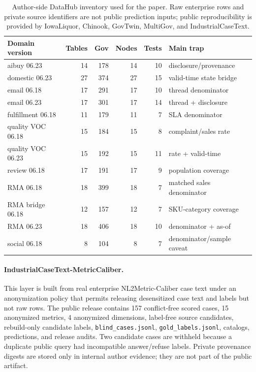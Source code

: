 \documentclass[letterpaper]{article}
\begin{document}
\begin{table}[h]
\centering
\scriptsize
\setlength{\tabcolsep}{2pt}
\begin{tabular}{lrrrrl}
\toprule
Domain version & Tables & Gov & Nodes & Tests & Main trap \\
\midrule
aibuy 06.23 & 14 & 178 & 14 & 10 & disclosure/provenance \\
domestic 06.23 & 27 & 374 & 27 & 15 & valid-time state bridge \\
email 06.18 & 17 & 291 & 17 & 10 & thread denominator \\
email 06.23 & 17 & 301 & 17 & 14 & thread + disclosure \\
fulfillment 06.18 & 11 & 179 & 11 & 7 & SLA denominator \\
quality VOC 06.18 & 15 & 184 & 15 & 8 & complaint/sales rate \\
quality VOC 06.23 & 15 & 192 & 15 & 11 & rate + valid-time \\
review 06.18 & 17 & 191 & 17 & 9 & population coverage \\
RMA 06.18 & 18 & 399 & 18 & 7 & matched sales denominator \\
RMA bridge 06.18 & 12 & 157 & 12 & 7 & SKU-category coverage \\
RMA 06.23 & 18 & 406 & 18 & 10 & denominator + as-of \\
social 06.18 & 8 & 104 & 8 & 7 & denominator/sample caveat \\
\bottomrule
\end{tabular}
\caption{Author-side DataHub inventory used for the paper. Raw enterprise rows and private source identifiers are not public prediction inputs; public reproducibility is provided by IowaLiquor, Chinook, GovTwin, MultiGov, and IndustrialCaseText.}
\end{table}

\paragraph{IndustrialCaseText-MetricCaliber.}
This layer is built from real enterprise NL2Metric-Caliber case text under an anonymization policy that permits releasing desensitized case text and labels but not raw rows. The public release contains 157 conflict-free scored cases, 15 anonymized metrics, 4 anonymized dimensions, label-free source candidates, rebuild-only candidate labels, \texttt{blind\_cases.jsonl}, \texttt{gold\_labels.jsonl}, catalogs, predictions, and release audits. Two candidate cases are withheld because a duplicate public query had incompatible answer/refuse labels. Private provenance digests are stored only in internal author evidence; they are not part of the public artifact.
\end{document}
